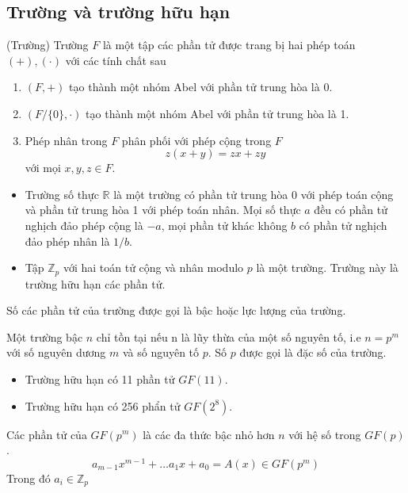 \documentclass[../main.tex]{subfiles}
\begin{document}
\subsection{Trường và trường hữu hạn}
\begin{dn}
(Trường) Trường $F$ là một tập các phần tử được trang bị hai phép toán $(+),(\cdot)$ với các tính chất sau
\begin{enumerate}

    \item $(F,+)$ tạo thành một nhóm Abel với phần tử trung hòa là 0.
    \item $(F/\{0\},\cdot)$ tạo thành một nhóm Abel với phần tử trung hòa là 1.
    \item Phép nhân trong $F$ phân phối với phép cộng trong $F$
    $$z(x+y)=zx+zy$$
    với mọi $x,y,z \in F$.
\end{enumerate}
\end{dn}
\begin{vd}
\end{vd}
\begin{itemize}
    \item Trường số thực $\mathbb{R}$ là một trường có phần tử trung hòa 0 với phép toán cộng và phần tử trung hòa 1 với phép toán nhân. Mọi số thực $a$ đều có phần tử nghịch đảo phép cộng là $-a$, mọi phần tử khác không $b$ có phần tử nghịch đảo phép nhân là $1/b$.
    \item Tập $\mathbb{Z}_p$ với hai toán tử cộng và nhân modulo $p$ là một trường. Trường này là trường hữu hạn các phần tử.
\end{itemize}

Số các phần tử của trường được gọi là bậc hoặc lực lượng của trường.
\begin{dl}
Một trường bậc $n$ chỉ tồn tại nếu n là lũy thừa của một số nguyên tố, i.e $n = p^m$ với số nguyên dương $m$ và số nguyên tố $p$. Số $p$ được gọi là đặc số của trường.
\end{dl}

\begin{vd}
\end{vd}
\begin{itemize}
    \item Trường hữu hạn có 11 phần tử $GF(11)$.
    \item Trường hữu hạn có 256 phẩn tử $GF(2^8)$.  
\end{itemize}

Các phần tử của $GF(p^m)$ là các đa thức bậc nhỏ hơn $n$ với hệ số trong $GF(p)$.
$$a_{m-1}x^{m-1} + \dots a_1x + a_0 = A(x) \in GF(p^m)
$$
Trong đó $a_i \in \mathbb{Z}_p$
\end{document}
